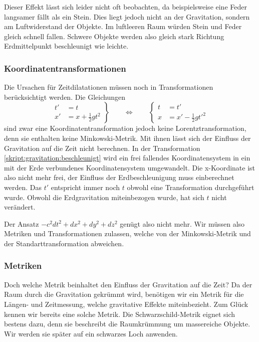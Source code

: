 \begin{refsection}
	Dieser Effekt lässt sich leider nicht oft beobachten, da beispielsweise eine Feder langsamer fällt als ein Stein. Dies liegt jedoch nicht an der Gravitation, sondern am Luftwiderstand der Objekte. Im luftleeren Raum würden Stein und Feder gleich schnell fallen. Schwere Objekte werden also gleich stark Richtung Erdmittelpunkt beschleunigt wie leichte.
	
	\subsubsection{Koordinatentransformationen}
    Die Ursachen für Zeitdilatationen müssen noch in Transformationen berücksichtigt werden. 
	Die Gleichungen 
	\begin{equation}\label{skript:gravitation:beschleunigt}
	\left.
	\begin{aligned}
	t'&=t\\
	x'&=x+\frac12gt^2
	\end{aligned}
	\right\}
	\qquad
	\Leftrightarrow
	\qquad
	\left\{
	\begin{aligned}
	t&=t'\\
	x&=x'-\frac12gt'^2
	\end{aligned}
	\right.
	\end{equation}
    sind zwar eine Koordinatentransformation jedoch keine Lorentztransformation, denn sie enthalten keine Minkowski-Metrik. Mit ihnen lässt sich der Einfluss der Gravitation auf die Zeit nicht berechnen. 
    In der Transformation \ref{skript:gravitation:beschleunigt} wird ein frei fallendes Koordinatensystem in ein mit der Erde verbundenes Koordinatensystem umgewandelt. Die x-Koordinate ist also nicht mehr frei, der Einfluss der Erdbeschleunigung muss einberechnet werden.
	Das $t'$ entspricht immer noch $t$ obwohl eine Transformation durchgeführt wurde. Obwohl die Erdgravitation miteinbezogen wurde, hat sich $t$ nicht verändert.
	
	Der Ansatz $ -c^2dt^2 + dx^2 + dy^2 + dz^2$ genügt also nicht mehr. Wir müssen also Metriken und Transformationen zulassen, welche von der Minkowski-Metrik und der Standarttransformation abweichen.
	
	\subsubsection{Metriken}\label{skript:chapter:zeitreisen:metriken}
	Doch welche Metrik beinhaltet den Einfluss der Gravitation auf die Zeit? 
	Da der Raum durch die Gravitation gekrümmt wird, benötigen wir ein Metrik für die Längen- und Zeitmessung, welche gravitative Effekte miteinbezieht.
	Zum Glück kennen wir bereits eine solche Metrik. Die Schwarzschild-Metrik eignet sich bestens dazu, denn sie beschreibt die Raumkrümmung um massereiche Objekte. Wir werden sie später auf ein schwarzes Loch anwenden. 


\end{refsection}
